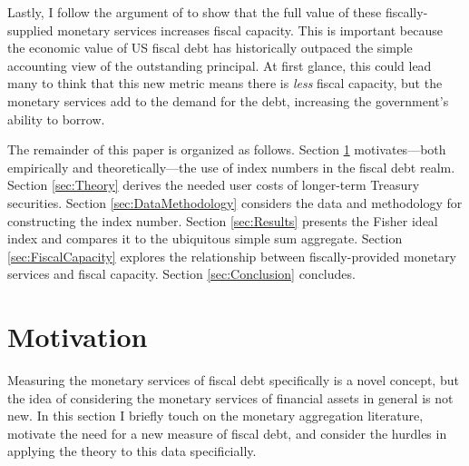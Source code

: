 \documentclass[11pt,a4paper,margin=1.5in]{article}
\begin{document}
Lastly, I follow the argument of \citet{Brunnermeier-Merkel-Sannikov:2022} to show that the full value of these fiscally-supplied monetary services increases fiscal capacity.
This is important because the economic value of US fiscal debt has historically outpaced the simple accounting view of the outstanding principal.
At first glance, this could lead many to think that this new metric means there is {\em less} fiscal capacity, but the monetary services add to the demand for the debt, increasing the government's ability to borrow.


The remainder of this paper is organized as follows.
Section \ref{sec:Motivation} motivates---both empirically and theoretically---the use of index numbers in the fiscal debt realm.
Section \ref{sec:Theory} derives the needed user costs of longer-term Treasury securities.
Section \ref{sec:DataMethodology} considers the data and methodology for constructing the index number.
Section \ref{sec:Results} presents the Fisher ideal index and compares it to the ubiquitous simple sum aggregate.
Section \ref{sec:FiscalCapacity} explores the relationship between fiscally-provided monetary services and fiscal capacity.
Section \ref{sec:Conclusion} concludes.


\section{Motivation}
\label{sec:Motivation}
Measuring the monetary services of fiscal debt specifically is a novel concept, but the idea of considering the monetary services of financial assets in general is not new.
In this section I briefly touch on the monetary aggregation literature, motivate the need for a new measure of fiscal debt, and consider the hurdles in applying the theory to this data specificially. 
\end{document}
